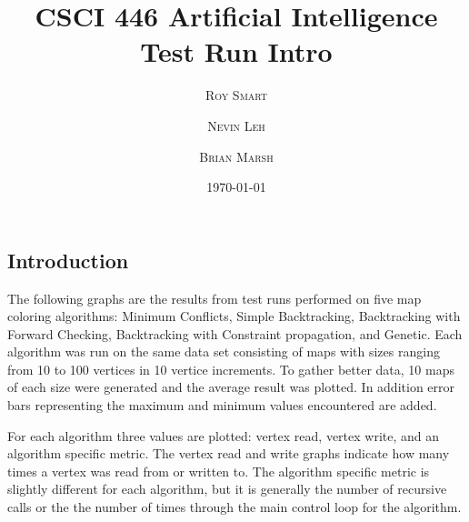 \documentclass{article}
\title{\vspace{-15mm}\fontsize{24pt}{10pt}\selectfont\textbf{CSCI 446 Artificial Intelligence \\ Test Run Intro} \\[-2mm]} %
\date{\today}
\author{
\large
\textsc{Roy Smart} \and \textsc{Nevin Leh} \and \textsc{Brian Marsh}\\[2mm] %
}
\begin{document}
\maketitle %

\thispagestyle{fancy} %



\begin{multicols}{2} %
\normalsize
\section{Introduction}
The following graphs are the results from test runs performed on five map coloring algorithms: Minimum Conflicts, Simple Backtracking, Backtracking with Forward Checking, Backtracking with Constraint propagation, and
Genetic. Each algorithm was run on the same data set consisting of maps with sizes ranging from 10 to 100 vertices in 10 vertice increments. To gather better data, 10 maps of each size were generated and the average result was plotted. In addition error bars representing the maximum and minimum values encountered are added.

For each algorithm three values are plotted: vertex read, vertex write, and an algorithm specific metric. The vertex read and write graphs indicate how many times a vertex was read from or written to. The algorithm specific metric is slightly different for each algorithm, but it is generally the number of recursive calls or the the number of times through the main control loop for the algorithm. 


\end{multicols}
\end{document}

